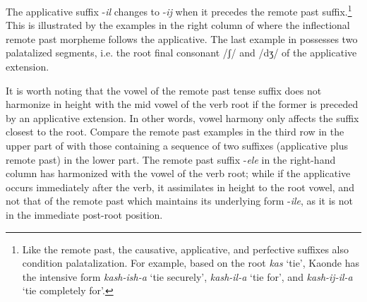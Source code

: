 \documentclass[output=paper]{langsci/langscibook}
\begin{document}
The applicative suffix -\textit{il} changes to -\textit{ij} when it precedes the remote past suffix.\footnote{Like the remote past, the causative, applicative, and perfective suffixes also condition palatalization. For example, based on the root \textit{kas} ‘tie’, Kaonde has the intensive form \textit{kash-ish-a} ‘tie securely’, \textit{kash-il-a} ‘tie for’, and \textit{kash-ij-il-a} ‘tie completely for’.} This is illustrated by the examples in the right column of  where the inflectional remote past morpheme follows the applicative. The last example in  possesses two palatalized segments, i.e. the root final consonant /ʃ/ and /dʒ/ of the applicative extension. 


\begin{table}

\caption{Voiced palatalization of applicative /l/}
\label{tab:13.kawasha}
\end{table}

It is worth noting that the vowel of the remote past tense suffix does not harmonize in height with the mid vowel of the verb root if the former is preceded by an applicative extension. In other words, vowel harmony only affects the suffix closest to the root. Compare the remote past examples in the third row in the upper part of  with those containing a sequence of two suffixes (applicative plus remote past) in the lower part. The remote past suffix -\textit{ele} in the right-hand column has harmonized with the vowel of the verb root; while if the applicative occurs immediately after the verb, it assimilates in height to the root  vowel, and not that of the remote past which maintains its underlying form -\textit{ile}, as it is not in the immediate post-root position.
 
\end{document}
